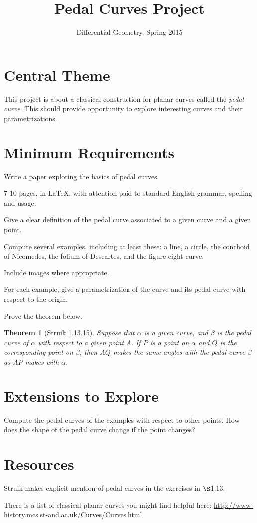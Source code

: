 \documentclass[12pt]{amsart}
\theoremstyle{plain}
\newtheorem*{theorem}{Theorem}
\begin{document}
\title{Pedal Curves Project}
\author{Differential Geometry, Spring 2015}

\maketitle

\section*{Central Theme}

This project is about a classical construction for planar curves called the 
\emph{pedal curve}. This should provide opportunity to explore interesting curves 
and their parametrizations. 

\section*{Minimum Requirements}

Write a paper exploring the basics of pedal curves. 
\begin{compactitem}
\item 7-10 pages, in \LaTeX, with attention paid to standard English grammar, spelling and usage.
\item Give a clear definition of the pedal curve associated to a given curve and a given point.
\item Compute several examples, including at least these: a line, a circle, the conchoid of Nicomedes, the folium of Descartes, and the figure eight curve.
\item Include images where appropriate.
\item For each example, give a parametrization of the curve and its pedal curve with respect to the origin.
\item Prove the theorem below.
\end{compactitem}

\begin{theorem} [Struik 1.13.15] Suppose that $\alpha$ is a given curve, and $\beta$ is the pedal curve of $\alpha$ with respect to a given point $A$. If $P$ is a point on $\alpha$ and $Q$ is the corresponding point on $\beta$, then $AQ$ makes the same angles with the pedal curve $\beta$ as $AP$ makes with $\alpha$.
\end{theorem}

\section*{Extensions to Explore}

Compute the pedal curves of the examples with respect to other points. How does the shape of the pedal curve change if the point changes?

\section*{Resources}

Struik makes explicit mention of pedal curves in the exercises in $\S$1.13.

There is a list of classical planar curves you might find helpful here:
\url{http://www-history.mcs.st-and.ac.uk/Curves/Curves.html}
\end{document}
